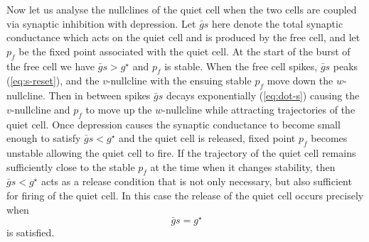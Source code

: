 \documentclass[utf8]{frontiersFPHY} %
\newcommand{\gbar}{\bar g}
\begin{document}

Now let us analyse the nullclines of the quiet cell when the two cells are coupled via synaptic inhibition with depression.
Let $\gbar s$ here denote the total synaptic conductance which acts on the quiet cell and is produced by the free cell, and let $p_{f}$ be the fixed point associated with the quiet cell.
At the start of the burst of the free cell we have $\gbar s > g^{\star}$ and $p_{f}$ is stable.
When the free cell spikes, $\gbar s$ peaks (\cref{eq:s-reset}), and the $v$-nullcline with the ensuing stable $p_f$ move down the $w$-nullcline.
Then in between spikes $\gbar s$ decays exponentially (\cref{eq:dot-s}) causing the $v$-nullcline and $p_{f}$ to move up the $w$-nullcline while attracting trajectories of the quiet cell.
Once depression causes the synaptic conductance to become small enough to satisfy $\gbar s<g^{\star}$ and the quiet cell is released, fixed point $p_{f}$ becomes unstable allowing the quiet cell to fire.
If the trajectory of the quiet cell remains sufficiently close to the stable $p_{f}$ at the time when it changes stability, then $\gbar s < g^{\star}$ acts as a release condition that is not only necessary, but also sufficient for firing of the quiet cell.
In this case the release of the quiet cell occurs precisely when
\begin{equation}
 ~\label{eq:release}
  \gbar s=g^{\star}
\end{equation}
is satisfied.
\end{document}
